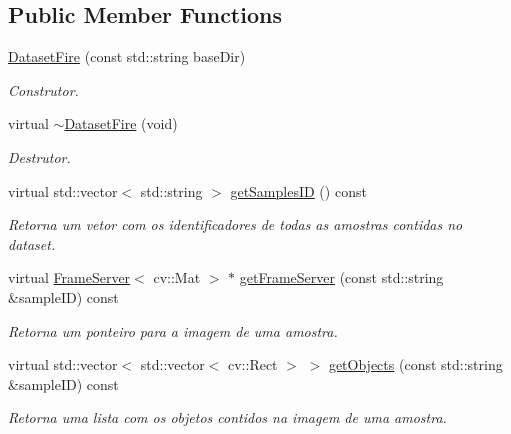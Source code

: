 \subsection*{Public Member Functions}
\begin{DoxyCompactItemize}
\item 
\hyperlink{class_dataset_fire_aca72c752d0b957c6fd33bc4cc83aa48c}{Dataset\+Fire} (const std\+::string base\+Dir)
\begin{DoxyCompactList}\small\item\em Construtor. \end{DoxyCompactList}\item 
\hypertarget{class_dataset_fire_ae8c160d80a95ff180eb7a5e9c6f7e1a9}{}virtual \hyperlink{class_dataset_fire_ae8c160d80a95ff180eb7a5e9c6f7e1a9}{$\sim$\+Dataset\+Fire} (void)\label{class_dataset_fire_ae8c160d80a95ff180eb7a5e9c6f7e1a9}

\begin{DoxyCompactList}\small\item\em Destrutor. \end{DoxyCompactList}\item 
\hypertarget{class_dataset_fire_a8f2602813f5b8c2c6512690efbabb2df}{}virtual std\+::vector$<$ std\+::string $>$ \hyperlink{class_dataset_fire_a8f2602813f5b8c2c6512690efbabb2df}{get\+Samples\+I\+D} () const \label{class_dataset_fire_a8f2602813f5b8c2c6512690efbabb2df}

\begin{DoxyCompactList}\small\item\em Retorna um vetor com os identificadores de todas as amostras contidas no dataset. \end{DoxyCompactList}\item 
virtual \hyperlink{class_vision_core_1_1_interfaces_1_1_frame_server}{Frame\+Server}$<$ cv\+::\+Mat $>$ $\ast$ \hyperlink{class_dataset_fire_a367c3fb2404cb97f5234542de8379d6d}{get\+Frame\+Server} (const std\+::string \&sample\+I\+D) const 
\begin{DoxyCompactList}\small\item\em Retorna um ponteiro para a imagem de uma amostra. \end{DoxyCompactList}\item 
virtual std\+::vector$<$ std\+::vector$<$ cv\+::\+Rect $>$ $>$ \hyperlink{class_dataset_fire_a5bd8609aff7b688bccfc3ed6e8299159}{get\+Objects} (const std\+::string \&sample\+I\+D) const 
\begin{DoxyCompactList}\small\item\em Retorna uma lista com os objetos contidos na imagem de uma amostra. \end{DoxyCompactList}\end{DoxyCompactItemize}



